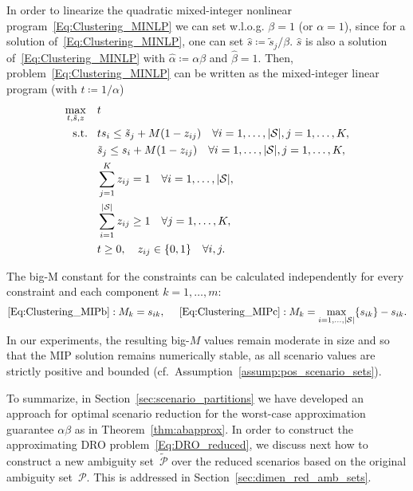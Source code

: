 \documentclass{article}
\newcommand{\mP}{\mathcal{P}}
\newcommand{\mS}{\mathcal{S}}
\newcommand{\tP}{\tilde{\mP}}
\begin{document}
In order to linearize the quadratic mixed-integer nonlinear program~\eqref{Eq:Clustering_MINLP} we can set w.l.o.g. \(\beta=1\) (or \(\alpha=1\)), since for a solution of~\eqref{Eq:Clustering_MINLP}, one can set \(\hat{s}\coloneqq \tilde{s}_j/\beta\). \(\hat{s}\) is also a solution of~\eqref{Eq:Clustering_MINLP} with \(\hat{\alpha}\coloneqq \alpha \beta\) and \(\hat{\beta}=1\).
Then, problem~\eqref{Eq:Clustering_MINLP} can be written as the mixed-integer linear program (with \(t\coloneqq 1/\alpha\))
\begin{subequations} \label{Eq:Clustering_MIP}
	\begin{align}
		\max_{t,\tilde{s},z} \quad & t \label{Eq:Clustering_MIPa}\\
		\text{ s.t.} \hspace{0.3cm} & t s_i \leq  \tilde{s}_j + M(1-z_{ij})\quad \forall i=1,\ldots,|\mS|, j=1,\ldots,K, \label{Eq:Clustering_MIPb}
		\\
		& \tilde{s}_j \leq  s_i + M(1-z_{ij}) \quad \forall i=1,\ldots,|\mS|, j=1,\ldots,K, \label{Eq:Clustering_MIPc}	
		\\
		&\sum_{j=1}^{K} z_{ij} = 1 \quad \forall i=1,\ldots,|\mS|, \label{Eq:Clustering_MIPd}
		\\
		& \sum_{i=1}^{|\mS|}z_{ij} \geq 1 \quad \forall j=1,\ldots,K, \label{Eq:Clustering_MIPe}
		\\
		& t \geq 0, \quad  z_{ij} \in \{0,1\} \quad \forall i,j.\label{Eq:Clustering_MIPf}
	\end{align}
\end{subequations}

The big-M constant for the constraints can be calculated independently
for every constraint and each component $k=1,\ldots,m$:
\begin{align*}
	\eqref{Eq:Clustering_MIPb}: M_k= s_{ik}, \quad
	~\eqref{Eq:Clustering_MIPc}: M_k= \max_{i=1,\ldots,|\mS|}\{s_{ik}\} - s_{ik}.
\end{align*}
In our experiments, the resulting big-\(M\) values remain moderate in size and so that the MIP solution remains numerically stable, 
as all scenario values are strictly positive and bounded (cf.~Assumption~\ref{assump:pos_scenario_sets}).

To summarize, in Section~\ref{sec:scenario_partitions} we have
developed an approach for optimal scenario reduction for the worst-case approximation guarantee $\alpha\beta$ as in Theorem~\ref{thm:abapprox}.
In order to construct the approximating DRO problem~\eqref{Eq:DRO_reduced}, we discuss next how to construct a new ambiguity set~$\tP$ over the reduced scenarios based on the original ambiguity set~$\mP$.
This is addressed in Section~\ref{sec:dimen_red_amb_sets}.
\end{document}
